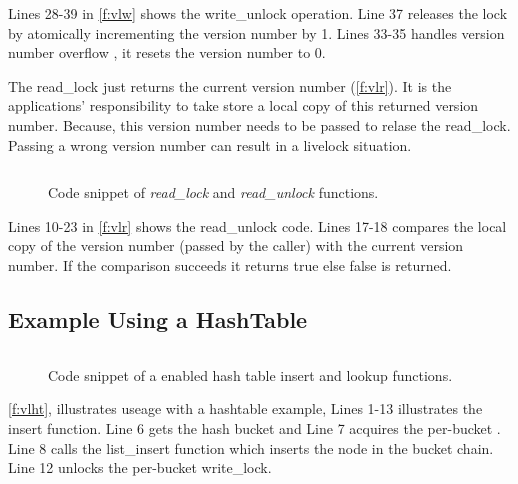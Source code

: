 Lines 28-39 in \autoref{f:vlw} shows the write\_unlock operation. Line 37
releases the lock by atomically incrementing the version number by 1. 
Lines 33-35 handles version number overflow \ie, it resets the version number to
0. 

The read\_lock just returns the current version number (\autoref{f:vlr}). It is
the applications' responsibility to take store a local copy of this returned
version number. Because, this version number needs to be passed to relase the
read\_lock. Passing a wrong version number can result in a livelock situation. 


\begin{figure}[t]
 \centering
 \begin{subfloat}
 \centering
 \inputminted[xleftmargin=11pt,fontsize=\scriptsize,escapeinside=@@]{c}{code/vlr.c}
 \end{subfloat}
 \coderule
	\caption{Code snippet of \sys \emph{read\_lock} and \emph{read\_unlock} 
	functions. }
 \label{f:vlr}
\end{figure}

Lines 10-23 in \autoref{f:vlr} shows the read\_unlock code. Lines 17-18 compares
the local copy of the version number (passed by the caller) with the current
version number. If the comparison succeeds it returns true else false is
returned. 


\subsection{\sys Example Using a HashTable}
\label{s:des:eg}

\begin{figure}[t]
 \centering
 \begin{subfloat}
 \centering
 \inputminted[xleftmargin=11pt,fontsize=\scriptsize,escapeinside=@@]{c}{code/vlht.c}
 \end{subfloat}
 \coderule
 \caption{ Code snippet of a \sys enabled
	hash table insert and lookup functions.} 
 \label{f:vlht}
\end{figure}

\autoref{f:vlht}, illustrates \sys useage with a hashtable  example, 
Lines 1-13 illustrates the insert function. Line 6 gets the hash bucket and Line
7 acquires the per-bucket \sys.  Line 8 calls the list\_insert function which
inserts the node in the bucket chain. Line 12 unlocks the per-bucket
write\_lock.  

